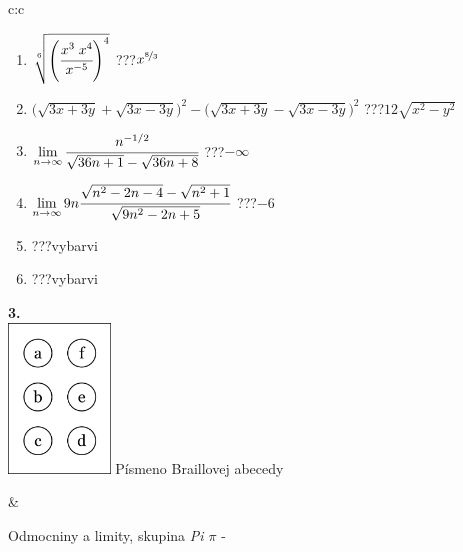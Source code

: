 \documentclass[10pt]{report}
\begin{document}
\begin{tabular}{c:c}
\begin{minipage}[c][104.5mm][t]{0.5\linewidth}
\begin{center}
\begin{minipage}{0.79\linewidth}
\begin{center}
\begin{varwidth}{\linewidth}
\begin{enumerate}
\small
\item $\sqrt[6]{\left(\cfrac{x^{3}\;x^{4}}{x^{-5}}\right)^{4}}$\quad \dotfill\; ???\;\dotfill \quad $x^{\nicefrac{8}{3}}$
\item {\footnotesize{\scriptsize$\big(\sqrt{3x+3y}+\sqrt{3x-3y}\big)^2-\big(\sqrt{3x+3y}-\sqrt{3x-3y}\big)^2$}\quad \dotfill\; ???\;\dotfill \quad $12\sqrt{x^2-y^2}$}
\item $\lim\limits_{n\to\infty}\cfrac{n^{-1/2}}{\sqrt{36n+1}-\sqrt{36n+8}}$\quad \dotfill\; ???\;\dotfill \quad $-\infty$
\item $\lim\limits_{n\to\infty}9n\cfrac{\sqrt{n^2-2n-4}-\sqrt{n^2+1}}{\sqrt{9n^2-2n+5}}$\quad \dotfill\; ???\;\dotfill \quad $-6$
\item \quad \dotfill\; ???\;\dotfill \quad vybarvi
\item \quad \dotfill\; ???\;\dotfill \quad vybarvi
\end{enumerate}
\end{varwidth}
\end{center}
\end{minipage}
\begin{minipage}{0.20\linewidth}
\begin{center}
{\Huge\bfseries 3.} \\[2mm]
\includegraphics[height=40mm]{../images/braille.png}
{\small Písmeno Braillovej abecedy}
\end{center}
\end{minipage}
\end{center}
\end{minipage}
&
\begin{minipage}[c][104.5mm][t]{0.5\linewidth}
\begin{center}
\vspace{7mm}
{\huge Odmocniny a limity, skupina \textit{Pi $\pi$} -}\\[5mm]

\end{center}
\end{minipage}
\end{tabular}
\end{document}

